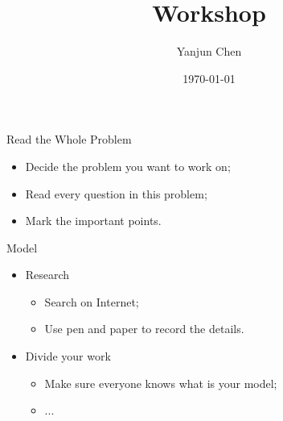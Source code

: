 \documentclass{beamer}
\title[University Physics Competition]{Workshop} %
\author{Yanjun Chen} %
\institute[UM-SJTU JI] %
{
    University of Michigan - Shanghai Jiao Tong University Joint Institute\\%
\medskip
}
\date{\today} %
\begin{document}
\begin{frame}
    \titlepage %
\end{frame}


\section{} %

\begin{frame}{Read the Whole Problem}
    \vfill
    \begin{itemize}
        \item Decide the problem you want to work on;
        \item Read every question in this problem;
        \item Mark the important points.
    \end{itemize}
    \vfill
\end{frame}


\begin{frame}{Model}
    \begin{itemize}
        \item Research
        \begin{itemize}
            \item Search on Internet;
            \item Use pen and paper to record the details.
        \end{itemize}
        \item Divide your work
        \begin{itemize}
            \item Make sure everyone knows what is your model;
            \item ... %
        \end{itemize}
    \end{itemize}
\end{frame}
\end{document}
